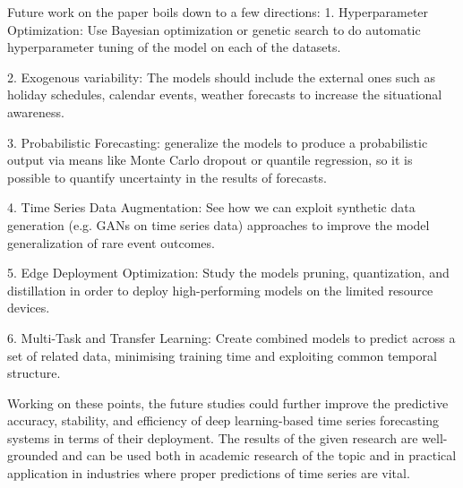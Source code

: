 \documentclass[conference]{IEEEtran}
\begin{document}
Future work on the paper boils down to a few directions:
1. Hyperparameter Optimization: Use Bayesian optimization or genetic search to do automatic hyperparameter tuning of the model on each of the datasets.

2. Exogenous variability: The models should include the external ones such as holiday schedules, calendar events, weather forecasts to increase the situational awareness.

3. Probabilistic Forecasting: generalize the models to produce a probabilistic output via means like Monte Carlo dropout or quantile regression, so it is possible to quantify uncertainty in the results of forecasts.

4. Time Series Data Augmentation: See how we can exploit synthetic data generation (e.g. GANs on time series data) approaches to improve the model generalization of rare event outcomes.

5. Edge Deployment Optimization: Study the models pruning, quantization, and distillation in order to deploy high-performing models on the limited resource devices.

6. Multi-Task and Transfer Learning: Create combined models to predict across a set of related data, minimising training time and exploiting common temporal structure.

Working on these points, the future studies could further improve the predictive accuracy, stability, and efficiency of deep learning-based time series forecasting systems in terms of their deployment. The results of the given research are well-grounded and can be used both in academic research of the topic and in practical application in industries where proper predictions of time series are vital.



\end{document}
